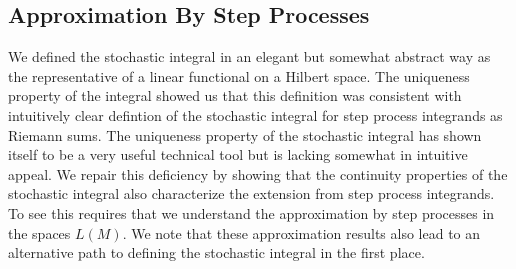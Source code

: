 \subsection{Approximation By Step Processes}

We defined the stochastic integral in an elegant but somewhat abstract way as the representative of a linear functional on a Hilbert space.  The uniqueness property of the integral showed us that this definition was consistent with intuitively clear defintion of the stochastic integral for step process integrands as Riemann sums.  The uniqueness property of the stochastic integral has shown itself to be a very useful technical tool but is lacking somewhat in intuitive appeal.  We repair this deficiency by showing that the continuity properties of the stochastic integral also characterize the extension from step process integrands.  To see this requires that we understand the approximation by step processes in the spaces $L(M)$.  We note that these approximation results also lead to an alternative path to defining the stochastic integral in the first place.  

